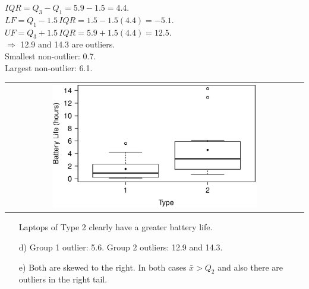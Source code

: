 \documentclass[12pt]{article}
\begin{document}
{\begin{minipage}[t]{0.98\textwidth}
\begin{minipage}[t]{0.47\textwidth}
$IQR = Q_3 - Q_1 = 5.9 - 1.5 = 4.4.$\\[0.2cm]
$LF = Q_1 - 1.5 \,IQR = 1.5-1.5(4.4)=-5.1.$\\
$UF = Q_3 + 1.5 \,IQR = 5.9+1.5(4.4)=12.5.$\\[0.1cm]
$\Rightarrow$ 12.9 and 14.3 are outliers.\\[0.2cm]
Smallest non-outlier: 0.7.\\[0.1cm]
Largest non-outlier: 6.1.
\end{minipage}\vspace{0.03\textwidth}
\begin{minipage}[t]{1\textwidth}
\begin{center}
\begin{tabular}{c}
\includegraphics[width=0.7\textwidth, trim = 0.0cm 0.5cm 0.3cm 1.5cm, clip]{Boxplots}\\
\end{tabular}
\end{center}
\begin{enumerate}
\item[]
Laptops of Type 2 clearly have a greater battery life.
\item[d)] Group 1 outlier: 5.6. \quad Group 2 outliers: 12.9 and 14.3.
\item[e)] Both are skewed to the right. In both cases $\bar x > Q_2$ and also there are outliers in the right tail.
\end{enumerate}
\end{minipage}

\end{minipage}}\vspace{0.03\textwidth}
\end{document}
